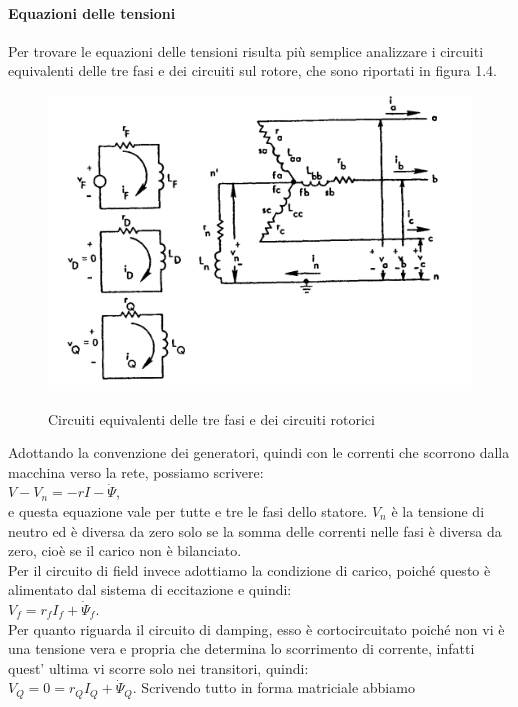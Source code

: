 \documentclass[Lau,noexaminfo]{sapthesis}
\begin{document}
	\paragraph{Equazioni delle tensioni}
	Per trovare le equazioni delle tensioni risulta più semplice analizzare i circuiti equivalenti delle tre fasi e dei circuiti sul rotore, che sono riportati in figura 1.4.
	\begin{figure}
		\centering
		\includegraphics[height=0.3\textheight]{trifase}\\
		\caption{Circuiti equivalenti delle tre fasi e dei circuiti rotorici}
	\end{figure}
	Adottando la convenzione dei generatori, quindi con le correnti che scorrono dalla macchina verso la rete, possiamo scrivere:\\
	$V-V_n=-rI-\dot{\Psi}$, \\e questa equazione vale per tutte e tre le fasi dello statore. $V_n$ è la tensione di neutro ed è diversa da zero solo se la somma delle correnti nelle fasi è diversa da zero, cioè se il carico non è bilanciato.\\
	Per il circuito di field invece adottiamo la condizione di carico, poiché questo è alimentato dal sistema di eccitazione e quindi:\\
	$V_f=r_fI_f+\dot{\Psi}_f$.\\
	Per quanto riguarda il circuito di damping, esso è cortocircuitato poiché non vi è una tensione vera e propria che determina lo scorrimento di corrente, infatti quest' ultima vi scorre solo nei transitori, quindi:\\
	$V_Q=0=r_QI_Q + \dot{\Psi}_Q$. Scrivendo tutto in forma matriciale abbiamo\\\\
\end{document}
